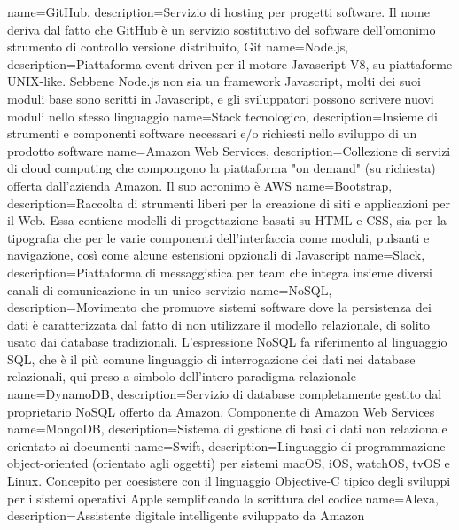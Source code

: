  {
	name=GitHub,
	description={Servizio di hosting per progetti software. Il nome deriva dal fatto che GitHub è
	un servizio sostitutivo del software dell'omonimo strumento di controllo
	versione distribuito, Git}
}
 {
	name=Node.js,
	description={Piattaforma event-driven per il motore Javascript V8, su piattaforme UNIX-like.
	Sebbene Node.js non sia un framework Javascript, molti dei suoi moduli base sono scritti in
	Javascript, e gli sviluppatori possono scrivere nuovi moduli nello stesso linguaggio}
}
 {
	name=Stack tecnologico,
	description={Insieme di strumenti e componenti software necessari e/o richiesti nello sviluppo
	di un prodotto software}
}
 {
	name=Amazon Web Services,
	description={Collezione di servizi di cloud computing che compongono la piattaforma
	"on demand" (su richiesta) offerta dall'azienda Amazon. Il suo acronimo è AWS}
}
 {
	name=Bootstrap,
	description={Raccolta di strumenti liberi per la creazione di siti e applicazioni per il Web.
	Essa contiene modelli di progettazione basati su HTML e CSS, sia per la tipografia che per le
	varie componenti dell'interfaccia come moduli, pulsanti e navigazione, così come alcune
	estensioni opzionali di Javascript}
}
 {
	name=Slack,
	description={Piattaforma di messaggistica per team che integra insieme diversi canali di
	comunicazione in un unico servizio}
}
 {
	name=NoSQL,
	description={Movimento che promuove sistemi software dove la persistenza dei dati è
	caratterizzata dal fatto di non utilizzare il modello relazionale, di solito usato dai
	database tradizionali. L'espressione NoSQL fa riferimento al linguaggio SQL, che è il più
	comune linguaggio di interrogazione dei dati nei database relazionali, qui preso a simbolo
	dell'intero paradigma relazionale}
}
 {
	name=DynamoDB,
	description={Servizio di database completamente gestito dal proprietario NoSQL offerto da
	Amazon. Componente di Amazon Web Services}
}
 {
	name=MongoDB,
	description={Sistema di gestione di basi di dati non relazionale orientato ai documenti}
}
 {
	name=Swift,
	description={Linguaggio di programmazione object-oriented (orientato agli oggetti) per
	sistemi macOS, iOS, watchOS, tvOS e Linux. Concepito per coesistere con il linguaggio
	Objective-C tipico degli sviluppi per i sistemi operativi Apple semplificando
	la scrittura del codice}
}
 {
	name=Alexa,
	description={Assistente digitale intelligente sviluppato da Amazon}
}
